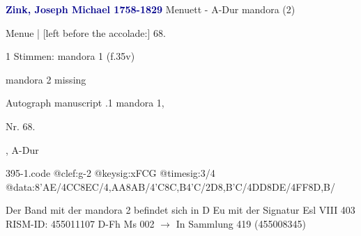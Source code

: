 \documentclass[twocolumn]{book}
\begin{document}
\newline \par \vspace{7pt} \textcolor{darkblue}{\textbf{Zink, Joseph Michael  1758-1829}}
\newline Menuett - A-Dur
\newline mandora (2)
\newline \begin{itshape}[f.35v, at left:] Menue | [left before the accolade:] 68.\end{itshape} 
\newline \textcolor{darkblue}{}  1 Stimmen: mandora 1  (f.35v)
\newline \begin{small} mandora 2 missing\end{small} 
\newline Autograph manuscript
.1  mandora 1, \begin{itshape}Nr. 68.\end{itshape}, A-Dur  
\begin{filecontents*}{395-1.code}
@clef:g-2
@keysig:xFCG
@timesig:3/4
@data:{8'AE}/4CC{8EC}/4,AA{8AB}/4'C{8C,B}4'C/2D{8,B'C}/4DD{8DE}/4FF{8D,B}/
\end{filecontents*}
\newline
%
\newline Der Band mit der mandora 2 befindet sich in D Eu mit der Signatur Esl VIII 403
\newline RISM-ID: 455011107
\newline D-Fh  Ms 002
\newline $\rightarrow$ In Sammlung 419 (455008345)
      
\end{document}
